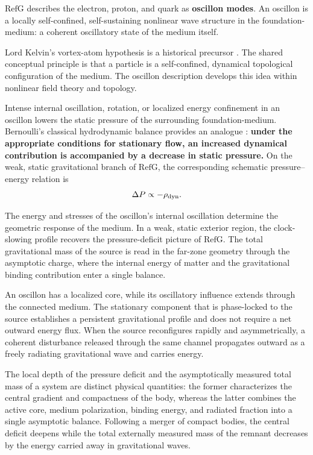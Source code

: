 \documentclass[11pt,a4paper]{article}
\newcommand{\RefG}{\mathrm{RefG}}
\begin{document}
$\RefG$ describes the electron, proton, and quark as \textbf{oscillon modes}. An oscillon is a locally self-confined, self-sustaining nonlinear wave structure in the foundation-medium: a coherent oscillatory state of the medium itself.

Lord Kelvin's vortex-atom hypothesis is a historical precursor \citep{thomson1867}. The shared conceptual principle is that a particle is a self-confined, dynamical topological configuration of the medium. The oscillon description develops this idea within nonlinear field theory and topology.

Intense internal oscillation, rotation, or localized energy confinement in an oscillon lowers the static pressure of the surrounding foundation-medium. Bernoulli's classical hydrodynamic balance provides an analogue \citep{bernoulli1738}: \textbf{under the appropriate conditions for stationary flow, an increased dynamical contribution is accompanied by a decrease in static pressure.} On the weak, static gravitational branch of $\RefG$, the corresponding schematic pressure--energy relation is
\begin{equation}
\Delta P \propto -\rho_{\rm dyn}.
\end{equation}

The energy and stresses of the oscillon's internal oscillation determine the geometric response of the medium. In a weak, static exterior region, the clock-slowing profile recovers the pressure-deficit picture of $\RefG$. The total gravitational mass of the source is read in the far-zone geometry through the asymptotic charge, where the internal energy of matter and the gravitational binding contribution enter a single balance.

An oscillon has a localized core, while its oscillatory influence extends through the connected medium. The stationary component that is phase-locked to the source establishes a persistent gravitational profile and does not require a net outward energy flux. When the source reconfigures rapidly and asymmetrically, a coherent disturbance released through the same channel propagates outward as a freely radiating gravitational wave and carries energy.

The local depth of the pressure deficit and the asymptotically measured total mass of a system are distinct physical quantities: the former characterizes the central gradient and compactness of the body, whereas the latter combines the active core, medium polarization, binding energy, and radiated fraction into a single asymptotic balance. Following a merger of compact bodies, the central deficit deepens while the total externally measured mass of the remnant decreases by the energy carried away in gravitational waves.
\end{document}
